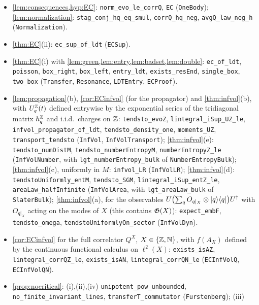 \begin{itemize}[leftmargin=1.5em,itemsep=1pt]
\texttt{CutLocalExamples}).
\item \cref{lem:consequences,hyp:EC}: \texttt{norm\_evo\_le\_corrQ}, \texttt{EC} (\texttt{OneBody});
\cref{lem:normalization}: \texttt{stag\_conj\_hq\_eq\_smul}, \texttt{corrQ\_hq\_neg}, \texttt{avgQ\_law\_neg\_h}
(\texttt{Normalization}).
\item \cref{thm:EC}(ii): \texttt{ec\_sup\_of\_ldt} (\texttt{ECSup}).
\item \cref{thm:EC}(i) with \cref{lem:green,lem:entry,lem:badset,lem:double}: \texttt{ec\_of\_ldt},
\texttt{poisson}, \texttt{box\_right}, \texttt{box\_left}, \texttt{entry\_ldt},
\texttt{exists\_resEnd}, \texttt{single\_box}, \texttt{two\_box} (\texttt{Transfer}, \texttt{Resonance},
\texttt{LDTEntry}, \texttt{ECProof}).
\item \cref{lem:propagation}(b), \cref{cor:ECinfvol} (for the propagator) and \cref{thm:infvol}(b), with
$U^{\mathbb{Z}}_q(t)$ defined entrywise by the exponential series of the tridiagonal matrix $h^{\mathbb{Z}}_q$ and i.i.d.\ charges on
$\mathbb{Z}$: \texttt{tendsto\_evoZ}, \texttt{lintegral\_iSup\_UZ\_le}, \texttt{infvol\_propagator\_of\_ldt},
\texttt{tendsto\_density\_one}, \texttt{moments\_UZ}, \texttt{transport\_tendsto} (\texttt{InfVol},
\texttt{InfVolTransport}); \cref{thm:infvol}(e): \texttt{tendsto\_numDistM}, \texttt{tendsto\_numberEntropyM},
\texttt{numberEntropyZ\_le} (\texttt{InfVolNumber}, with \texttt{lgt\_numberEntropy\_bulk} of
\texttt{NumberEntropyBulk}); \cref{thm:infvol}(c), uniformly in $M$: \texttt{infvol\_LR} (\texttt{InfVolLR});
\cref{thm:infvol}(d): \texttt{tendstoUniformly\_entM}, \texttt{tendsto\_SGM}, \texttt{lintegral\_iSup\_entZ\_le},
\texttt{areaLaw\_halfInfinite} (\texttt{InfVolArea}, with \texttt{lgt\_areaLaw\_bulk} of \texttt{SlaterBulk});
\cref{thm:infvol}(a), for the observables $U\bigl(\sum_qO_{q|_X}\otimes|q\rangle\langle q|\bigr)U^\dagger$ with $O_{q|_X}$ acting on the
modes of $X$ (this contains $\mathfrak{G}(X)$): \texttt{expect\_embF}, \texttt{tendsto\_omega}, \texttt{tendstoUniformlyOn\_sector}
(\texttt{InfVolDyn}).
\item \cref{cor:ECinfvol} for the full correlator $Q^X$, $X\in\{\mathbb{Z},\mathbb{N}\}$, with $f(A_X)$ defined by the continuous
functional calculus on $\ell^2(X)$: \texttt{exists\_isAZ}, \texttt{lintegral\_corrQZ\_le}, \texttt{exists\_isAN},
\texttt{lintegral\_corrQN\_le} (\texttt{ECInfVolQ}, \texttt{ECInfVolQN}).
\item \cref{prop:nocritical}: (i),(ii),(iv) \texttt{unipotent\_pow\_unbounded},
\texttt{no\_finite\_invariant\_lines}, \texttt{transferT\_commutator} (\texttt{Furstenberg}); (iii)

\end{itemize}
